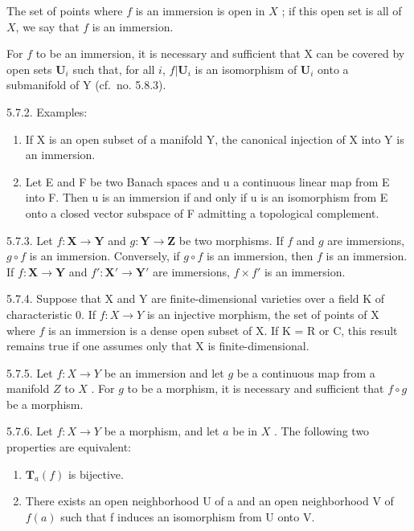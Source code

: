 The set of points where \(f\) is an immersion is open in \(X\) ; if this open set is all of \(X\), we say that \(f\) is an immersion.

For \(f\) to be an immersion, it is necessary and sufficient that X can be covered by open sets \(\mathbf{U}_{i}\) such that, for all \(i\), \(f|\mathbf{U}_{i}\) is an isomorphism of \(\mathbf{U}_{i}\) onto a submanifold of Y (cf.~no. 5.8.3).

5.7.2. Examples:

\begin{enumerate}
\def\labelenumi{(\alph{enumi})}
\item
  If X is an open subset of a manifold Y, the canonical injection of X into Y is an immersion.
\item
  Let E and F be two Banach spaces and u a continuous linear map from E into F. Then u is an immersion if and only if u is an isomorphism from E onto a closed vector subspace of F admitting a topological complement.
\end{enumerate}

5.7.3. Let \(f: \mathbf{X} \to \mathbf{Y}\) and \(g: \mathbf{Y} \to \mathbf{Z}\) be two morphisms. If \(f\) and \(g\) are immersions, \(g \circ f\) is an immersion. Conversely, if \(g \circ f\) is an immersion, then \(f\) is an immersion. If \(f: \mathbf{X} \to \mathbf{Y}\) and \(f': \mathbf{X}' \to \mathbf{Y}'\) are immersions, \(f \times f'\) is an immersion.

5.7.4. Suppose that X and Y are finite-dimensional varieties over a field K of characteristic 0. If \(f:X\to Y\) is an injective morphism, the set of points of X where \(f\) is an immersion is a dense open subset of X. If K = R or C, this result remains true if one assumes only that X is finite-dimensional.

5.7.5. Let \(f:X\to Y\) be an immersion and let \(g\) be a continuous map from a manifold \(Z\) to \(X\) . For \(g\) to be a morphism, it is necessary and sufficient that \(f\circ g\) be a morphism.

5.7.6. Let \(f: X \to Y\) be a morphism, and let \(a\) be in \(X\) . The following two properties are equivalent:

\begin{enumerate}
\def\labelenumi{(\roman{enumi})}
\item
  \(\mathbf{T}_{a}(f)\) is bijective.
\item
  There exists an open neighborhood U of a and an open neighborhood V of \(f(a)\) such that f induces an isomorphism from U onto V.
\end{enumerate}


